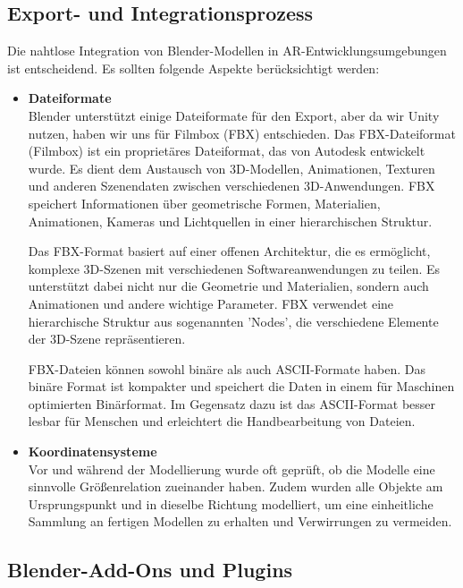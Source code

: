 \subsection{Export- und Integrationsprozess}
Die nahtlose Integration von Blender-Modellen in AR-Entwicklungsumgebungen ist entscheidend. Es sollten folgende
Aspekte berücksichtigt werden:
\begin{itemize}
    \item \textbf{Dateiformate}\\
    Blender unterstützt einige Dateiformate für den Export, aber da wir Unity nutzen, haben wir uns für Filmbox (FBX)
    entschieden. Das FBX-Dateiformat (Filmbox) ist ein proprietäres Dateiformat, das von Autodesk entwickelt
    wurde. Es dient dem Austausch von 3D-Modellen, Animationen, Texturen und anderen Szenendaten zwischen verschiedenen
    3D-Anwendungen. FBX speichert Informationen über geometrische Formen, Materialien, Animationen, Kameras und
    Lichtquellen in einer hierarchischen Struktur.

    Das FBX-Format basiert auf einer offenen Architektur, die es ermöglicht, komplexe 3D-Szenen mit verschiedenen
    Softwareanwendungen zu teilen. Es unterstützt dabei nicht nur die Geometrie und Materialien, sondern auch Animationen
    und andere wichtige Parameter. FBX verwendet eine hierarchische Struktur aus sogenannten 'Nodes', die verschiedene
    Elemente der 3D-Szene repräsentieren.

    FBX-Dateien können sowohl binäre als auch ASCII-Formate haben. Das binäre Format ist kompakter und speichert die
    Daten in einem für Maschinen optimierten Binärformat. Im Gegensatz dazu ist das ASCII-Format besser lesbar für
    Menschen und erleichtert die Handbearbeitung von Dateien.

    \item \textbf{Koordinatensysteme}\\
    Vor und während der Modellierung wurde oft geprüft, ob die Modelle eine sinnvolle Größenrelation zueinander haben.
    Zudem wurden alle Objekte am Ursprungspunkt und in dieselbe Richtung modelliert, um eine einheitliche Sammlung an
    fertigen Modellen zu erhalten und Verwirrungen zu vermeiden.

\end{itemize}

\subsection{Blender-Add-Ons und Plugins}

